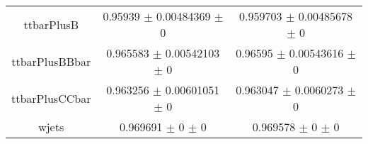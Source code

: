 \begin{table}
\begin{tabular}{ccc}
ttbarPlusB & \num{0.95939} $\pm$ \num{0.00484369} $\pm$ \num{0} & \num{0.959703} $\pm$ \num{0.00485678} $\pm$ \num{0}\\
ttbarPlusBBbar & \num{0.965583} $\pm$ \num{0.00542103} $\pm$ \num{0} & \num{0.96595} $\pm$ \num{0.00543616} $\pm$ \num{0}\\
ttbarPlusCCbar & \num{0.963256} $\pm$ \num{0.00601051} $\pm$ \num{0} & \num{0.963047} $\pm$ \num{0.0060273} $\pm$ \num{0}\\
wjets & \num{0.969691} $\pm$ \num{0} $\pm$ \num{0} & \num{0.969578} $\pm$ \num{0} $\pm$ \num{0}\\
\bottomrule
\end{tabular}
\end{table}